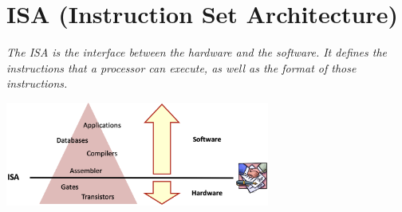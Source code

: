 \section{ISA (Instruction Set Architecture)}
\textit{The ISA is the interface between the hardware and the software. It defines the instructions that a processor can execute, as well as the format of those instructions.} \newline
\begin{center}
    \includegraphics[width=0.65\textwidth]{chapters/chapter1a/images/contract.png}
    \centering
\end{center}